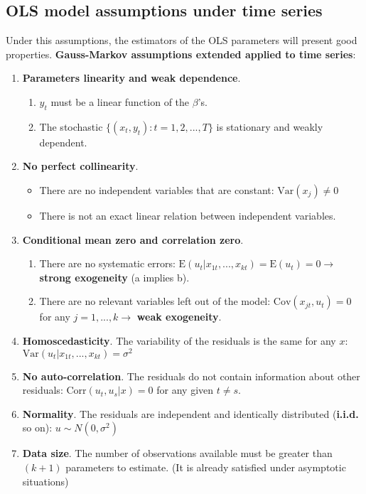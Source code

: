 \documentclass[10pt, a4paper, landscape]{extarticle}
\newcommand{\E}{\mathrm{E}}
\newcommand{\Var}{\mathrm{Var}}
\newcommand{\Cov}{\mathrm{Cov}}
\newcommand{\Corr}{\mathrm{Corr}}
\begin{document}
\begin{multicols}{3}
	\subsection*{OLS model assumptions under time series}
		Under this assumptions, the estimators of the OLS parameters will present good properties. \textbf{Gauss-Markov assumptions extended applied to time series}:
		\begin{enumerate}[leftmargin=*, label=ts\arabic*.]
			\item \textbf{Parameters linearity and weak dependence}.
			\begin{enumerate}[leftmargin=*, label=\alph*.]
				\item $y_t$ must be a linear function of the $\beta$'s.
				\item The stochastic $\lbrace(x_t, y_t): t = 1, 2, ..., T\rbrace$ is stationary and weakly dependent.
			\end{enumerate} 
			\item \textbf{No perfect collinearity}.
			\begin{itemize}[leftmargin=*]
				\item There are no independent variables that are constant: $\Var(x_j) \neq 0$
				\item There is not an exact linear relation between independent variables.
			\end{itemize}
			\item \textbf{Conditional mean zero and correlation zero}.
			\begin{enumerate}[leftmargin=*, label=\alph*.]
				\item There are no systematic errors: $\E(u_t | x_{1t}, ..., x_{kt}) = \E(u_t) = 0 \rightarrow$ \textbf{strong exogeneity} (a implies b).
				\item There are no relevant variables left out of the model: $\Cov(x_{jt} , u_t) = 0$ for any $j = 1, ..., k \rightarrow$ \textbf{weak exogeneity}.
			\end{enumerate}
			\item \textbf{Homoscedasticity}. The variability of the residuals is the same for any $x$: $\Var(u_t | x_{1t}, ..., x_{kt}) = \sigma^2$
			\item \textbf{No auto-correlation}. The residuals do not contain information about other residuals: $\Corr(u_t, u_s | x) = 0$ for any given $t \neq s$.
			\item \textbf{Normality}. The residuals are independent and identically distributed (\textbf{i.i.d.} so on): $u \sim N(0,\sigma^2)$
			\item \textbf{Data size}. The number of observations available must be greater than $(k + 1)$ parameters to estimate. (It is already satisfied under asymptotic situations)
		\end{enumerate}	

\end{multicols}
\end{document}
